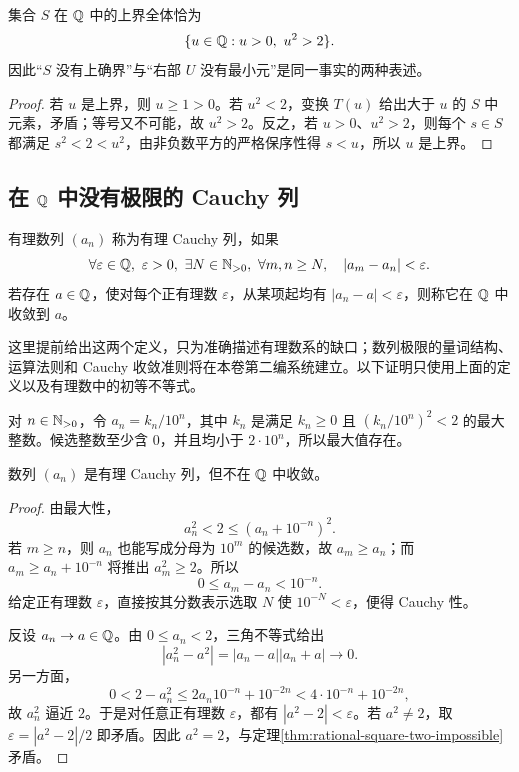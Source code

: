 \begin{proposition}[同一缺口的两侧]
集合 \(S\) 在 \(\mathbb{Q}\) 中的上界全体恰为
\[
 \{u\in\mathbb{Q}:u>0,\ u^2>2\}.
\]
因此“\(S\) 没有上确界”与“右部 \(U\) 没有最小元”是同一事实的两种表述。
\end{proposition}

\begin{proof}
若 \(u\) 是上界，则 \(u\ge1>0\)。若 \(u^2<2\)，变换 \(T(u)\) 给出大于 \(u\) 的 \(S\) 中元素，矛盾；等号又不可能，故 \(u^2>2\)。反之，若 \(u>0\)、\(u^2>2\)，则每个 \(s\in S\) 都满足 \(s^2<2<u^2\)，由非负数平方的严格保序性得 \(s<u\)，所以 \(u\) 是上界。
\end{proof}

\subsection{在 \texorpdfstring{\(\mathbb{Q}\)}{Q} 中没有极限的 Cauchy 列}


\begin{definition}
有理数列 \((a_n)\) 称为有理 Cauchy 列，如果
\[
\forall\varepsilon\in\Q,\ \varepsilon>0,\ \exists N\in\Npos,\
 \forall m,n\ge N,\quad |a_m-a_n|<\varepsilon.
\]
若存在 \(a\in\mathbb{Q}\)，使对每个正有理数 \(\varepsilon\)，从某项起均有 \(|a_n-a|<\varepsilon\)，则称它在 \(\mathbb{Q}\) 中收敛到 \(a\)。
\end{definition}

这里提前给出这两个定义，只为准确描述有理数系的缺口；数列极限的量词结构、运算法则和 Cauchy 收敛准则将在本卷第二编系统建立。以下证明只使用上面的定义以及有理数中的初等不等式。

对 \(n\in\mathbb{N}_{>0}\)，令 \(a_n=k_n/10^n\)，其中 \(k_n\) 是满足 \(k_n\ge0\) 且 \((k_n/10^n)^2<2\) 的最大整数。候选整数至少含 \(0\)，并且均小于 \(2\cdot10^n\)，所以最大值存在。

\begin{theorem}
数列 \((a_n)\) 是有理 Cauchy 列，但不在 \(\mathbb{Q}\) 中收敛。
\end{theorem}

\begin{proof}
由最大性，
\[
 a_n^2<2\le(a_n+10^{-n})^2.
\]
若 \(m\ge n\)，则 \(a_n\) 也能写成分母为 \(10^m\) 的候选数，故 \(a_m\ge a_n\)；而 \(a_m\ge a_n+10^{-n}\) 将推出 \(a_m^2\ge2\)。所以
\[
 0\le a_m-a_n<10^{-n}.
\]
给定正有理数 \(\varepsilon\)，直接按其分数表示选取 \(N\) 使 \(10^{-N}<\varepsilon\)，便得 Cauchy 性。

反设 \(a_n\to a\in\mathbb{Q}\)。由 \(0\le a_n<2\)，三角不等式给出
\[
 |a_n^2-a^2|=|a_n-a||a_n+a|\longrightarrow0.
\]
另一方面，
\[
 0<2-a_n^2\le 2a_n10^{-n}+10^{-2n}
 <4\cdot10^{-n}+10^{-2n},
\]
故 \(a_n^2\) 逼近 \(2\)。于是对任意正有理数 \(\varepsilon\)，都有 \(|a^2-2|<\varepsilon\)。若 \(a^2\ne2\)，取 \(\varepsilon=|a^2-2|/2\) 即矛盾。因此 \(a^2=2\)，与定理\ref{thm:rational-square-two-impossible}矛盾。
\end{proof}

